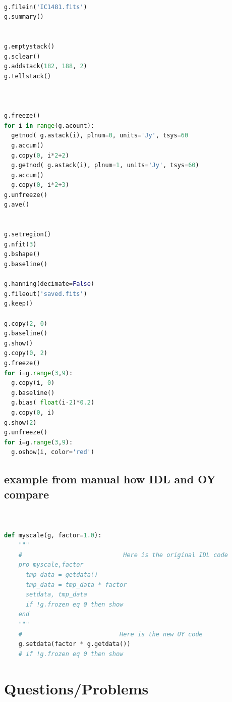 \documentclass[12pt,a4paper]{article}
\begin{document}
\begin{lstlisting}[language=python]

g.filein('IC1481.fits')
g.summary()


g.emptystack()
g.sclear()
g.addstack(182, 188, 2)
g.tellstack()



g.freeze()
for i in range(g.acount):
  getnod( g.astack(i), plnum=0, units='Jy', tsys=60
  g.accum()
  g.copy(0, i*2+2)
  g.getnod( g.astack(i), plnum=1, units='Jy', tsys=60)
  g.accum()
  g.copy(0, i*2+3)
g.unfreeze()
g.ave()


g.setregion()
g.nfit(3)
g.bshape()
g.baseline()

g.hanning(decimate=False)
g.fileout('saved.fits')
g.keep()

g.copy(2, 0)
g.baseline()
g.show()
g.copy(0, 2)
g.freeze()
for i=g.range(3,9):
  g.copy(i, 0)
  g.baseline()
  g.bias( float(i-2)*0.2)
  g.copy(0, i)
g.show(2)
g.unfreeze()
for i=g.range(3,9):
  g.oshow(i, color='red')
\end{lstlisting}

\subsection{example from manual how IDL and OY compare}

\begin{lstlisting}[language=python]

  
def myscale(g, factor=1.0):
    """
    #                            Here is the original IDL code
    pro myscale,factor
      tmp_data = getdata()
      tmp_data = tmp_data * factor
      setdata, tmp_data
      if !g.frozen eq 0 then show
    end
    """
    #                           Here is the new OY code
    g.setdata(factor * g.getdata())
    # if !g.frozen eq 0 then show
\end{lstlisting}

\section{Questions/Problems}
\end{document}
